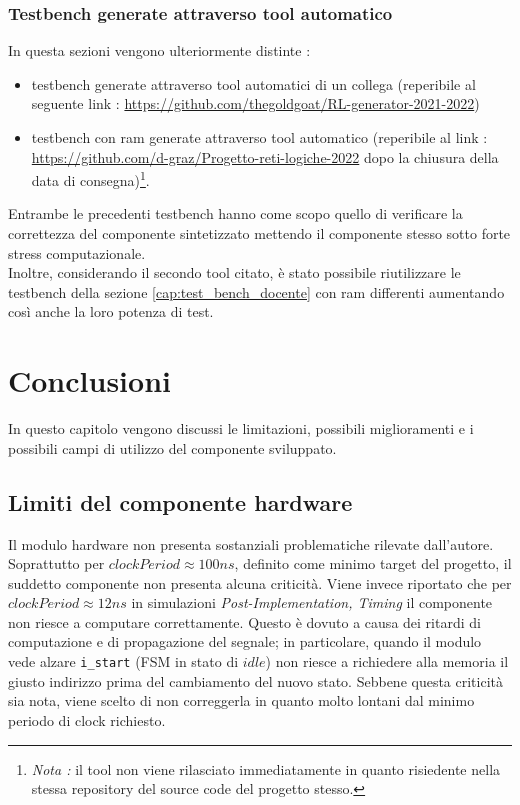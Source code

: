 \documentclass[11pt,a4paper]{article}
\begin{document}
                    \subsubsection{Testbench generate attraverso tool automatico}
                        In questa sezioni vengono ulteriormente distinte :
                        \begin{itemize}
                            \item testbench generate attraverso tool automatici di un collega (reperibile al seguente link : \footnotesize{\url{https://github.com/thegoldgoat/RL-generator-2021-2022}})
                            \item testbench con ram generate attraverso tool automatico (reperibile al link : \\\footnotesize{\url{https://github.com/d-graz/Progetto-reti-logiche-2022}} dopo la chiusura della data di consegna)\footnote[2]{\textit{Nota :} il tool non viene rilasciato immediatamente in quanto risiedente nella stessa repository del source code del progetto stesso.}.
                        \end{itemize}
                        Entrambe le precedenti testbench hanno come scopo quello di verificare la correttezza del componente sintetizzato mettendo il componente stesso sotto forte stress computazionale.\\
                        Inoltre, considerando il secondo tool citato, è stato possibile riutilizzare le testbench della sezione \ref{cap:test_bench_docente} con ram differenti aumentando così anche la loro potenza di test.
    \section{Conclusioni}
            In questo capitolo vengono discussi le limitazioni, possibili miglioramenti e i possibili campi di utilizzo del componente sviluppato. 
        \subsection{Limiti del componente hardware}
            Il modulo hardware non presenta sostanziali problematiche rilevate dall'autore. Soprattutto per $clockPeriod \approx 100ns$, definito come minimo target del progetto, il suddetto componente non presenta alcuna criticità.
            Viene invece riportato che per $clockPeriod \approx 12ns$ in simulazioni \textit{Post-Implementation, Timing} il componente non riesce a computare correttamente.
            Questo è dovuto a causa dei ritardi di computazione e di propagazione del segnale; in particolare, quando il modulo vede alzare \texttt{i\_start} (FSM in stato di $idle$) non riesce a richiedere alla memoria il giusto indirizzo prima del cambiamento del nuovo stato.
            Sebbene questa criticità sia nota, viene scelto di non correggerla in quanto molto lontani dal minimo periodo di clock richiesto.
\end{document}
